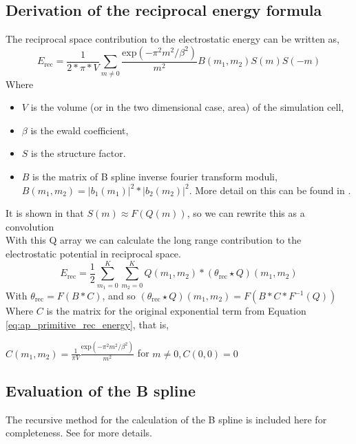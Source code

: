 \documentclass[pdftex,twoside,a4paper]{report}
\newcommand{\bcen}{\begin{center}}
\newcommand{\ecen}{\end{center}}
\begin{document}
\subsection{Derivation of the reciprocal energy formula}
\label{ap:deriv_rec_energy}
The reciprocal space contribution to the electrostatic energy can be written as,\\
\begin{equation}
E_{\text{rec}} = \frac{1}{2*\pi*V} \sum_{m \not= 0} \frac{\text{exp}(- \pi^2 m^2 / \beta^2)}{m^2} B(m_1,m_2) S(m) S(-m)
  \label{eq:ap_primitive_rec_energy} \end{equation}
Where
\begin{itemize}
    \item $V$ is the volume (or in the two dimensional case, area) of the simulation cell,
    \item $\beta$ is the ewald coefficient,
    \item $S$ is the structure factor.
    \item $B$ is the matrix of B spline inverse fourier transform moduli, $B(m_1,m_2) = |b_1(m_1)|^2 * |b_2(m_2)|^2$. More detail on this can be found in \cite{essmann:8577}.
\end{itemize}
It is shown in \cite{essmann:8577} that $S(m) \approx F(Q(m))$, so we can rewrite this as a convolution\\
With this Q array we can calculate the long range contribution to the electrostatic potential in reciprocal space.\\

\begin{equation}
E_{\text{rec}} = \frac{1}{2} \sum_{m_1 = 0}^K \sum_{m_2 = 0}^K Q(m_1,m_2) * (\theta_{\text{rec}} \star Q)(m_1,m_2)
\label{eq:ap_energy_rec}
\end{equation}
With $\theta_{\text{rec}} = F(B * C)$, and so $(\theta_{\text{rec}} \star Q)(m_1,m_2) = F(B * C * F^{-1}(Q))$ \cite{essmann:8577} \cite{lee05}\\
Where $C$ is the matrix for the original exponential term from Equation \ref{eq:ap_primitive_rec_energy}, that is,
 \bcen
$\displaystyle
C(m_1,m_2) = \frac{1}{\pi V} \frac{\text{exp}(- \pi^2 m^2 / \beta^2)}{m^2} $ for $ m \not= 0, C(0,0) = 0$
\ecen 

\subsection{Evaluation of the B spline}
\label{sec:eval_bspline}
The recursive method for the calculation of the B spline is included here for completeness. See \cite{essmann:8577} \cite{lee05} for more details.
\end{document}
